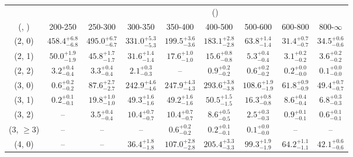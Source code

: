 \begin{table}[h!]
\tiny
\centering
{}
\begin{tabular}
{ccccccccc}
	\hline\hline
&	& \multicolumn{8}{c}{\scalht (\gev)} \\ 
	 (\njet,  \nb) & 200-250 & 250-300 & 300-350 & 350-400 & 400-500 & 500-600 & 600-800 & 800-$\infty$ \\ [0.8ex] 
\hline
	(2, 0) & $458.4^{+ 6.8 }_{- 6.8 }$ & $495.0^{+ 6.7 }_{- 6.7 }$ & $331.0^{+ 5.3 }_{- 5.3 }$ & $199.5^{+ 3.6 }_{- 3.6 }$ & $183.1^{+ 2.8 }_{- 2.8 }$ & $63.8^{+ 1.4 }_{- 1.4 }$ & $31.4^{+ 0.7 }_{- 0.7 }$ & $34.5^{+ 0.6 }_{- 0.6 }$ \\[0.5ex] 
	(2, 1) & $50.0^{+ 1.9 }_{- 1.9 }$ & $45.8^{+ 1.7 }_{- 1.7 }$ & $31.6^{+ 1.4 }_{- 1.4 }$ & $17.6^{+ 1.0 }_{- 1.0 }$ & $15.6^{+ 0.8 }_{- 0.8 }$ & $5.3^{+ 0.4 }_{- 0.4 }$ & $3.1^{+ 0.2 }_{- 0.2 }$ & $3.6^{+ 0.2 }_{- 0.2 }$ \\[0.5ex] 
	(2, 2) & $3.2^{+ 0.4 }_{- 0.4 }$ & $3.3^{+ 0.4 }_{- 0.4 }$ & $2.1^{+ 0.3 }_{- 0.3 }$ & -- & $0.9^{+ 0.2 }_{- 0.2 }$ & $0.6^{+ 0.2 }_{- 0.2 }$ & $0.2^{+ 0.0 }_{- 0.0 }$ & $0.1^{+ 0.0 }_{- 0.0 }$ \\[0.5ex] 
	(3, 0) & $0.6^{+ 0.2 }_{- 0.2 }$ & $87.6^{+ 2.7 }_{- 2.7 }$ & $242.9^{+ 4.6 }_{- 4.6 }$ & $247.9^{+ 4.3 }_{- 4.3 }$ & $293.6^{+ 3.8 }_{- 3.8 }$ & $108.6^{+ 1.9 }_{- 1.9 }$ & $61.8^{+ 0.9 }_{- 0.9 }$ & $49.4^{+ 0.7 }_{- 0.7 }$ \\[0.5ex] 
	(3, 1) & $0.2^{+ 0.1 }_{- 0.1 }$ & $19.8^{+ 1.0 }_{- 1.0 }$ & $49.3^{+ 1.6 }_{- 1.6 }$ & $49.2^{+ 1.6 }_{- 1.6 }$ & $50.5^{+ 1.5 }_{- 1.5 }$ & $16.3^{+ 0.8 }_{- 0.8 }$ & $8.6^{+ 0.4 }_{- 0.4 }$ & $6.8^{+ 0.3 }_{- 0.3 }$ \\[0.5ex] 
	(3, 2) & -- & $3.5^{+ 0.4 }_{- 0.4 }$ & $10.4^{+ 0.7 }_{- 0.7 }$ & $10.4^{+ 0.7 }_{- 0.7 }$ & $8.6^{+ 0.5 }_{- 0.5 }$ & $2.5^{+ 0.3 }_{- 0.3 }$ & $0.9^{+ 0.1 }_{- 0.1 }$ & $0.6^{+ 0.1 }_{- 0.1 }$ \\[0.5ex] 
	(3, $\ge3$) & -- & -- & -- & $0.6^{+ 0.2 }_{- 0.2 }$ & $0.2^{+ 0.1 }_{- 0.1 }$ & $0.1^{+ 0.0 }_{- 0.0 }$ & -- & -- \\[0.5ex] 
	(4, 0) & -- & -- & $36.4^{+ 1.8 }_{- 1.8 }$ & $107.0^{+ 2.8 }_{- 2.8 }$ & $205.4^{+ 3.3 }_{- 3.3 }$ & $99.3^{+ 1.9 }_{- 1.9 }$ & $64.2^{+ 1.1 }_{- 1.1 }$ & $42.1^{+ 0.6 }_{- 0.6 }$ \\[0.5ex] 

\end{tabular}
\end{table}
